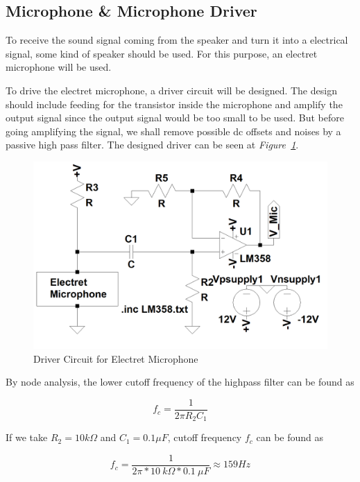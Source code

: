 \documentclass[paper]{IEEEtran}
\begin{document}
\subsection{Microphone \& Microphone Driver}
	To receive the sound signal coming from the speaker and turn it into a electrical signal, some kind of speaker should be used. For this purpose, an electret microphone will be used. 
	
	To drive the electret microphone, a driver circuit will be designed. The design should include feeding for the transistor inside the microphone and amplify the output signal since the output signal would be too small to be used. But before going amplifying the signal, we shall remove possible dc offsets and noises by a passive high pass filter. The designed driver can be seen at \textit{Figure~\ref{fig:micdr}}.

\begin{figure}[h!]
\setlength{\unitlength}{\textwidth}
\center 
\includegraphics[width=0.45\unitlength]{mic_v2.png}
\caption{\label{fig:micdr}Driver Circuit for Electret Microphone }
\end{figure}	


By node analysis, the lower cutoff frequency of the highpass filter can be found as

$$ f_{c} =\frac{1}{2\pi R_{2}C_{1}} $$

If we take $R_{2}=10k\Omega$ and $C_{1}=0.1\mu F$, cutoff frequency $f_c$ can be found as

$$ f_{c} =\frac{1}{2\pi*10~k\Omega*0.1~\mu F}\approx 159 Hz $$
\end{document}
